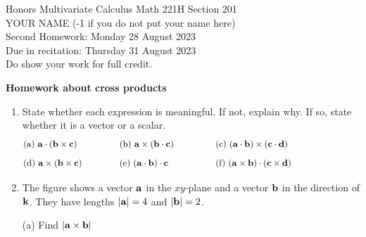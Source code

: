 \documentclass[12pt]{article}
\newcommand{\bfa}{{\bf a}}    %
\newcommand{\bfb}{{\bf b}}    %
\newcommand{\bfc}{{\bf c}}    %
\newcommand{\bfd}{{\bf d}}    %
\newcommand{\bfk}{{\bf k}}    %
\begin{document}
\LARGE 
\noindent
{\color{Maroon}Honors Multivariate Calculus \hfill Math 221H Section 201}\vspace{2pt}\\
\Large YOUR NAME (-1 if you do not put your name here)\vspace{2pt}\\
\large
Second Homework: \hfill Monday 28 August 2023\\
Due in recitation: \hfill Thursday 31 August 2023\\

{\color{red}Do show your work for full credit.}

\normalsize

{\bf {\color{Maroon}Homework about cross products}}
\begin{enumerate}  %

\item State whether each expression is meaningful.
  If not, explain why.
  If so, state whether it is a vector or a scalar.\vspace{-5pt}
  \[
  \makebox[1.5in][l]{(a)  $\bfa\cdot(\bfb\times\bfc)$}
  \makebox[1.5in][l]{(b)  $\bfa \times (\bfb \cdot \bfc)$}
  \makebox[2.5in][l]{(c) $(\bfa\cdot\bfb)\times (\bfc\cdot \bfd)$}\vspace{-5pt}
 \]
  \[
  \makebox[1.5in][l]{(d)  $\bfa\times(\bfb\times\bfc)$}
  \makebox[1.5in][l]{(e)  $(\bfa \cdot \bfb) \cdot \bfc$}
  \makebox[2.5in][l]{(f) $(\bfa\times\bfb)\cdot (\bfc\times \bfd)$}
 \]

\item \begin{minipage}[t]{4.5in}
  The figure shows a vector $\bfa$ in the $xy$-plane and a vector $\bfb$ in the direction of $\bfk$.
  They have lengths $|\bfa|=4$ and $|\bfb|=2$.

  (a) Find $|\bfa\times\bfb|$


\end{minipage}
\end{enumerate}
\end{document}
